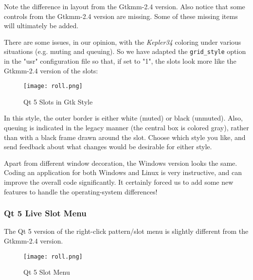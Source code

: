    Note the difference in layout from the Gtkmm-2.4 version.
   Also notice that some controls from the Gtkmm-2.4 version are missing.
   Some of these missing items will ultimately be added.

   There are some issues, in our opinion, with the \textsl{Kepler34} coloring
   under various situations (e.g. muting and queuing).  So we have adapted the
   \texttt{grid\_style} option in the "usr" configuration file so that, if set
   to "1", the slots look more like the Gtkmm-2.4 version of the slots:

\begin{figure}[H]
   \centering 
   \texttt{[image: roll.png]}
   \caption{Qt 5 Slots in Gtk Style}
   \label{fig:qt5_main_window_slots_gtkstyle}
\end{figure}

   In this style, the outer border is either white (muted) or black (unmuted).
   Also, queuing is indicated in the legacy manner (the central box is colored
   gray), rather than with a black frame drawn around the slot.
   Choose which style you like, and send feedback about what changes would
   be desirable for either style.

%

   Apart from different window decoration, the Windows version looks
   the same.  Coding an application for both Windows and Linux is very
   instructive, and can improve the overall code significantly.  It certainly
   forced us to add some new features to handle the operating-system
   differences!

\subsubsection{Qt 5 Live Slot Menu}
\label{subsubsec:qt_portmidi_qt5_live_slot_menu}

   The Qt 5 version of the right-click pattern/slot menu is slightly different
   from the Gtkmm-2.4 version.

\begin{figure}[H]
   \centering 
   \texttt{[image: roll.png]}
   \caption{Qt 5 Slot Menu}
   \label{fig:qt5_main_window_slot_menu}
\end{figure}

